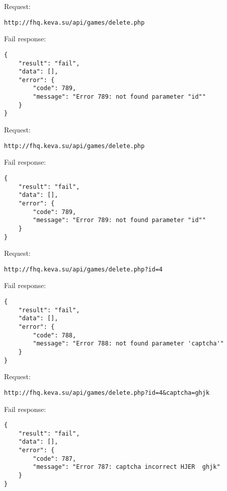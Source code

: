 Request:
\begin{Verbatim}[frame=single]
http://fhq.keva.su/api/games/delete.php
\end{Verbatim}

Fail response:
\begin{Verbatim}[frame=single]
{
    "result": "fail",
    "data": [],
    "error": {
        "code": 789,
        "message": "Error 789: not found parameter "id""
    }
}
\end{Verbatim}

Request:
\begin{Verbatim}[frame=single]
http://fhq.keva.su/api/games/delete.php
\end{Verbatim}

Fail response:
\begin{Verbatim}[frame=single]
{
    "result": "fail",
    "data": [],
    "error": {
        "code": 789,
        "message": "Error 789: not found parameter "id""
    }
}
\end{Verbatim}

Request:
\begin{Verbatim}[frame=single]
http://fhq.keva.su/api/games/delete.php?id=4
\end{Verbatim}

Fail response:
\begin{Verbatim}[frame=single]
{
    "result": "fail",
    "data": [],
    "error": {
        "code": 788,
        "message": "Error 788: not found parameter 'captcha'"
    }
}
\end{Verbatim}

Request:
\begin{Verbatim}[frame=single]
http://fhq.keva.su/api/games/delete.php?id=4&captcha=ghjk
\end{Verbatim}
Fail response:
\begin{Verbatim}[frame=single]
{
    "result": "fail",
    "data": [],
    "error": {
        "code": 787,
        "message": "Error 787: captcha incorrect HJER  ghjk"
    }
}
\end{Verbatim}
